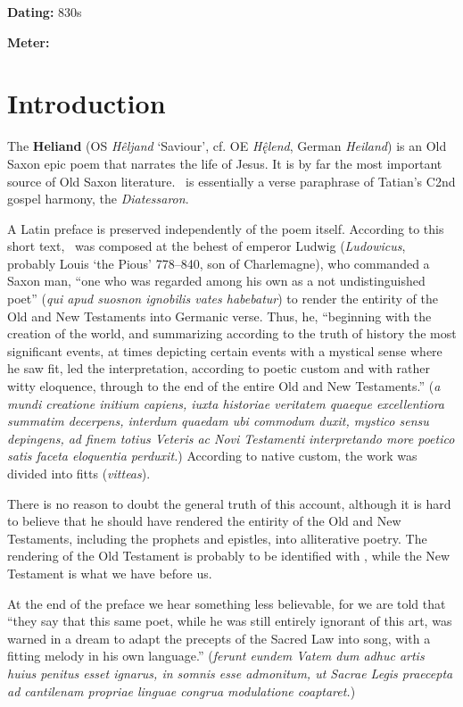 \def\thisBookCode{Heliand}

\begin{flushright}%
\textbf{Dating:} 830s

\textbf{Meter:} \Fornyrdislag%
\end{flushright}%

\section{Introduction}

The \textbf{Heliand} (OS \emph{Hêljand} ‘Saviour’, cf. OE \emph{Hę̂lend}, German \emph{Heiland}) is an Old Saxon epic poem that narrates the life of Jesus.  It is by far the most important source of Old Saxon literature.  \Heliand\ is essentially a verse paraphrase of Tatian’s C2nd gospel harmony, the \emph{Diatessaron}.

A Latin preface is preserved independently of the poem itself.  According to this short text, \Heliand\ was composed at the behest of emperor Ludwig (\emph{Ludowicus}, probably Louis ‘the Pious’ 778–840, son of Charlemagne), who commanded a Saxon man, “one who was regarded among his own as a not undistinguished poet” (\emph{qui apud suosnon ignobilis vates habebatur}) to render the entirity of the Old and New Testaments into Germanic verse.  Thus, he, “beginning with the creation of the world, and summarizing according to the truth of history the most significant events, at times depicting certain events with a mystical sense where he saw fit, led the interpretation, according to poetic custom and with rather witty eloquence, through to the end of the entire Old and New Testaments.” (\emph{a mundi creatione initium capiens, iuxta historiae veritatem quaeque excellentiora summatim decerpens, interdum quaedam ubi commodum duxit, mystico sensu depingens, ad finem totius Veteris ac Novi Testamenti interpretando more poetico satis faceta eloquentia perduxit.})  According to native custom, the work was divided into fitts (\emph{vitteas}).

There is no reason to doubt the general truth of this account, although it is hard to believe that he should have rendered the entirity of the Old and New Testaments, including the prophets and epistles, into alliterative poetry.  The rendering of the Old Testament is probably to be identified with \SaxonGenesis, while the New Testament is what we have before us.

At the end of the preface we hear something less believable, for we are told that “they say that this same poet, while he was still entirely ignorant of this art, was warned in a dream to adapt the precepts of the Sacred Law into song, with a fitting melody in his own language.” (\emph{ferunt eundem Vatem dum adhuc artis huius penitus esset ignarus, in somnis esse admonitum, ut Sacrae Legis praecepta ad cantilenam propriae linguae congrua modulatione coaptaret.})

